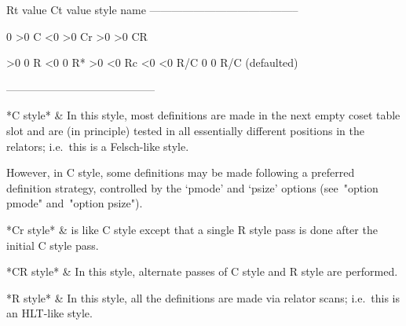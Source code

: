\begintt
Rt value     Ct value     style name
-----------------------------------------

   0           >0         C
  <0           >0         Cr
  >0           >0         CR

  >0            0         R
  <0            0         R*
  >0           <0         Rc
  <0           <0         R/C
   0            0         R/C (defaulted)

-----------------------------------------
\endtt

\beginitems

*C style* &
In this style, most definitions are made in the next empty coset table
slot and are  (in  principle)  tested  in  all  essentially  different
positions in the relators; i.e.~this is a Felsch-like style.

However, in  C  style,  some  definitions  may  be  made  following  a
preferred definition strategy, controlled by the `pmode'  and  `psize'
options (see~"option pmode" and~"option psize").

*Cr style* &
is like C style except that a single R style pass is  done  after  the
initial C style pass.

*CR style* &
In this style, alternate passes of C style and R style are performed.

*R  style* &
In this style,  all  the  definitions  are  made  via  relator  scans;
i.e.~this is an HLT-like style.

